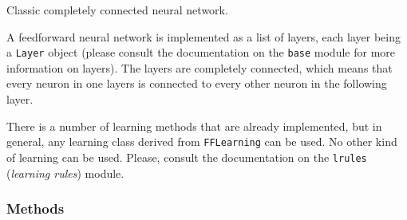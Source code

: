 Classic completely connected neural network.

A feedforward neural network is implemented as a list of layers, each layer
being a \texttt{Layer} object (please consult the documentation on the \texttt{base}
module for more information on layers). The layers are completely connected,
which means that every neuron in one layers is connected to every other
neuron in the following layer.

There is a number of learning methods that are already implemented, but in
general, any learning class derived from \texttt{FFLearning} can be used. No
other kind of learning can be used. Please, consult the documentation on the
\texttt{lrules} (\emph{learning rules}) module.


  \subsubsection{Methods}

    \vspace{0.5ex}

